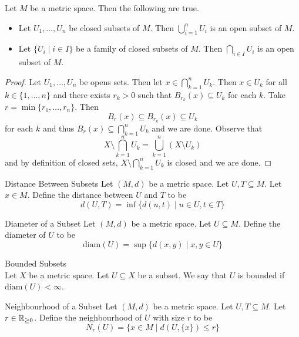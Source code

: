 \documentclass[a4paper]{article}
\begin{document}
\begin{prp}{}{} Let $M$ be a metric space. Then the following are true. 
\begin{itemize}
\item Let $U_1,\dots,U_n$ be closed subsets of $M$. Then $\bigcup_{i=1}^nU_i$ is an open subset of $M$. 
\item Let $\{U_i\;|\;i\in I\}$ be a family of closed subsets of $M$. Then $\bigcap_{i\in I}U_i$ is an open subset of $M$. 
\end{itemize} 
\begin{proof}
Let $U_1,\dots,U_n$ be opens sets. Then let $x\in\bigcap_{k=1}^nU_k$. Then $x\in U_k$ for all $k\in\{1,\dots,n\}$ and there exists $r_k>0$ such that $B_{r_k}(x)\subseteq U_k$ for each $k$. Take $r=\min\{r_1,\dots,r_n\}$. Then $$B_r(x)\subseteq B_{r_k}(x)\subseteq U_k$$ for each $k$ and thus $B_r(x)\subseteq\bigcap_{k=1}^nU_k$ and we are done. \linebreak\linebreak
Observe that $$X\setminus\bigcap_{k=1}^nU_k=\bigcup_{k=1}^n(X\setminus U_k)$$ and by definition of closed sets, $X\setminus\bigcap_{k=1}^nU_k$ is closed and we are done. 
\end{proof}
\end{prp}

\begin{defn}{Distance Between Subsets}{} Let $(M,d)$ be a metric space. Let $U,T\subseteq M$. Let $x\in M$. Define the distance between $U$ and $T$ to be $$d(U,T)=\inf\{d(u,t)\;|\;u\in U,t\in T\}$$
\end{defn}

\begin{defn}{Diameter of a Subset}{} Let $(M,d)$ be a metric space. Let $U\subseteq M$. Define the diameter of $U$ to be $$\text{diam}(U)=\sup\{d(x,y)\;|\;x,y\in U\}$$
\end{defn}

\begin{defn}{Bounded Subsets}{}\\
Let $X$ be a metric space. Let $U\subseteq X$ be a subset. We say that $U$ is bounded if $\text{diam}(U)<\infty$. 
\end{defn}

\begin{defn}{Neighbourhood of a Subset}{} Let $(M,d)$ be a metric space. Let $U,T\subseteq M$. Let $r\in\mathbb{R}_{\geq 0}$. Define the neighbourhood of $U$ with size $r$ to be $$N_r(U)=\{x\in M\;|\;d(U,\{x\})\leq r\}$$
\end{defn}
\end{document}
